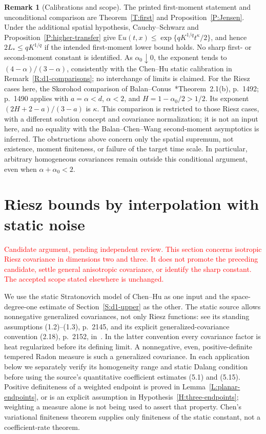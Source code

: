 \documentclass[12pt]{article}
\numberwithin{equation}{section}
\theoremstyle{definition}
\newtheorem{remark}[theorem]{Remark}
\newcommand{\E}{\mathbb{E}}
\newcommand{\myCmts}[1]{\begin{framed}\noindent\textcolor{red}{#1}\end{framed}}
\begin{document}
\begin{remark}[Calibrations and scope]\label{R:higher-calibrations}
  The printed first-moment statement and unconditional comparison are
  Theorem~\ref{T:first} and Proposition~\ref{P:Jensen}. Under the
  additional spatial hypothesis, Cauchy--Schwarz and
  Proposition~\ref{P:higher-transfer} give
  $\E u(t,x)\le\exp\{qK^{1/q}t^\kappa/2\}$, and hence
  $2L_*\le qK^{1/q}$ if the intended first-moment lower bound holds.
  No sharp first- or second-moment constant is
  identified. As $\alpha_0\downarrow0$, the exponent tends to
  $(4-\alpha)/(3-\alpha)$, consistently with the Chen--Hu static
  calibration in Remark~\ref{R:d1-comparisons}; no interchange of limits
  is claimed. For the Riesz cases here, the Skorohod comparison of
  Balan--Conus~\cite{balan.conus:16:intermittency}*{Theorem~2.1(b),
  p.~1492; p.~1490} applies with $a=\alpha<d$, $\alpha<2$, and
  $H=1-\alpha_0/2>1/2$. Its exponent
  $(2H+2-a)/(3-a)$ is $\kappa$. This comparison is restricted to
  those Riesz cases, with a different solution concept and covariance
  normalization; it is not an input here, and no equality with the
  Balan--Chen--Wang second-moment asymptotics is inferred. The
  obstructions above concern only the spatial supremum, not existence,
  moment finiteness, or failure of the target time scale. In particular,
  arbitrary homogeneous covariances remain outside this conditional
  argument, even when $\alpha+\alpha_0<2$.
\end{remark}

\section{Riesz bounds by interpolation with static noise}
\label{S:static-holder}

\myCmts{Candidate argument, pending independent review. This section concerns
isotropic Riesz covariance in dimensions two and three. It does not promote
the preceding candidate, settle general anisotropic covariance, or identify
the sharp constant. The accepted scope stated elsewhere is unchanged.}

We use the static Stratonovich model of Chen--Hu as one input and the
space-degree-one estimate of Section~\ref{S:d1-upper} as the other.
The static source allows nonnegative generalized covariances, not only
Riesz functions: see its standing assumptions (1.2)--(1.3), p.~2145,
and its explicit generalized-covariance convention (2.18), p.~2152,
in~\cite{chen.hu:25:hyperbolic}. In the latter convention every covariance
factor is heat regularized before its defining limit. A nonnegative,
even, positive-definite tempered Radon measure is such a generalized
covariance. In each application below we separately verify its homogeneity
range and static Dalang condition before using the source's quantitative
coefficient estimates (5.1) and (5.15). Positive definiteness of a weighted
endpoint is proved in Lemma~\ref{L:planar-endpoints}, or is an explicit
assumption in Hypothesis~\ref{H:three-endpoints}; weighting a measure alone
is not being used to assert that property. Chen's variational finiteness
theorem supplies only finiteness of the static constant, not a
coefficient-rate theorem.
\end{document}
